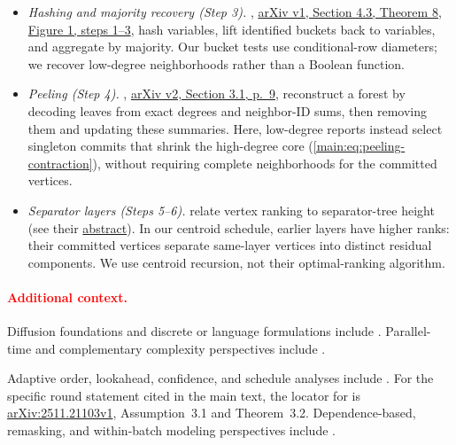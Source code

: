 {\begin{itemize}
\item \emph{Hashing and majority recovery (Step 3).}
\citet{bshouty2018exact},
\href{https://arxiv.org/pdf/1706.06934v1\#page=17}{arXiv v1, Section 4.3,
Theorem 8, Figure 1, steps 1--3}, hash variables, lift identified buckets
back to variables, and aggregate by majority.
Our bucket tests use conditional-row diameters; we recover low-degree
neighborhoods rather than a Boolean function.

\item \emph{Peeling (Step 4).}
\citet{becker2010referee},
\href{https://arxiv.org/pdf/1009.4447v2\#page=9}{arXiv v2, Section 3.1, p.~9},
reconstruct a forest by decoding leaves from exact degrees and neighbor-ID
sums, then removing them and updating these summaries.
Here, low-degree reports instead select singleton commits that shrink
the high-degree core (\cref{main:eq:peeling-contraction}), without requiring
complete neighborhoods for the committed vertices.

\item \emph{Separator layers (Steps 5--6).}
\citet{iyer1988optimal} relate vertex ranking to separator-tree height
(see their
\href{https://research.ibm.com/publications/optimal-node-ranking-of-trees}{abstract}).
In our centroid schedule, earlier layers have higher ranks: their committed
vertices separate same-layer vertices into distinct residual components.
We use centroid recursion, not their optimal-ranking algorithm.
\end{itemize}
}

\paragraph{\textcolor{red}{Additional context.}}
Diffusion foundations and discrete or language formulations include
\citet{sohldickstein2015deep,ho2020denoising,song2021score,
campbell2022continuous,li2022diffusionlm,he2023diffusionbert}.
Parallel-time and complementary complexity perspectives include
\citet{shih2023parallel,chen2024sublinear,yao2026parallelintime,
feng2025theoretical,jiang2026optimal,zhang2026generation,liang2026sharp}.

Adaptive order, lookahead, confidence, and schedule analyses include
\citet{li2024promises,kim2025train,hayakawa2026demystifying,
lee2025lookahead,fu2025bits,lavenant2025error,zhao2026adaptation,
cai2026confidence,jys}.
For the specific round statement cited in the main text, the locator for
\citet{fu2025bits} is
\href{https://arxiv.org/html/2511.21103v1}{arXiv:2511.21103v1},
Assumption~3.1 and Theorem~3.2.
Dependence-based, remasking, and within-batch modeling perspectives include
\citet{dmitriev2026efficient,dmitriev2026remasking,wainwright2026geometry,
bansal2026randomwalks,hayakawa2025distillation,liu2024discrete,
lezama2022discrete}.


